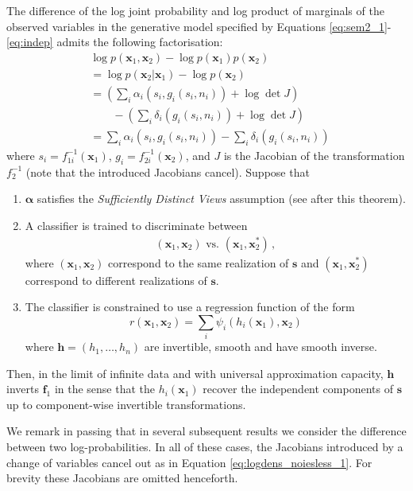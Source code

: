 \begin{theorem}
	\label{thm:noiseless1}
	The difference of the log joint probability and log product of marginals of the observed variables in the generative model specified by Equations \ref{eq:sem2_1}-\ref{eq:indep} admits the following factorisation:
	\begin{align}
	&\log p(\bm{x}_1, \bm{x}_2) - \log p(\bm{x}_1) p(\bm{x}_2) \nonumber \\
	&= \log p(\bm{x}_2 | \bm{x}_1) - \log p(\bm{x}_2) \nonumber\\
	&= \left(\sum_i \alpha_i(s_{i}, g_i(s_i, n_i)) + \log \det J \right) \nonumber\\
	&\qquad - \left( \sum_i \delta_i(g_i(s_i, n_i)) + \log \det J\right) \nonumber\\
	&= \sum_i \alpha_i(s_{i}, g_i(s_i, n_i)) - \sum_i \delta_i(g_i(s_i, n_i))\label{eq:logdens_noiesless_1} \,
	\end{align}
	where $s_i=f^{-1}_{1i}(\bm{x}_1)$, $g_i=f^{-1}_{2i}(\bm{x}_2)$,
	and $J$ is the Jacobian of the transformation $f^{-1}_2$ (note that the introduced Jacobians cancel).
	Suppose that
	\begin{enumerate}
		\item $\bm{\alpha}$ satisfies the \emph{Sufficiently Distinct Views} assumption (see after this theorem).
		\item A classifier is trained to discriminate between
		\begin{align*}
		(\bm{x}_{1},\bm{x}_{2}) \text{ vs. } (\bm{x}_{1},\bm{x}_{2}^{*})\,,
		\end{align*}
		where $(\bm{x}_{1},\bm{x}_{2})$ correspond to the same realization of $\bm{s}$ and $(\bm{x}_{1},\bm{x}_{2}^{*})$ correspond to different realizations of $\bm{s}$.
		\item The classifier is constrained to use a regression function of the form
		\begin{equation*}
		r(\bm{x}_{1},\bm{x}_{2})=\sum_{i}\psi_{i}(h_{i}(\bm{x}_{1}),\bm{x}_{2})
		\end{equation*}
		where $\bm{h} =(h_{1}, \ldots, h_{n})$  are invertible, smooth and have smooth inverse.
	\end{enumerate}
	
	Then, in the limit of infinite data and with universal approximation capacity, $\bm{h}$ inverts $\bm{f}_1$ in the sense that the $h_{i}(\bm{x}_1)$ recover the independent  components of $\bm{s}$ up to component-wise invertible transformations.
\end{theorem}
We remark in passing that in several subsequent results we consider the difference between two log-probabilities.
In all of these cases, the Jacobians introduced by a change of variables cancel out as in Equation \ref{eq:logdens_noiesless_1}.
For brevity these Jacobians are omitted henceforth.

